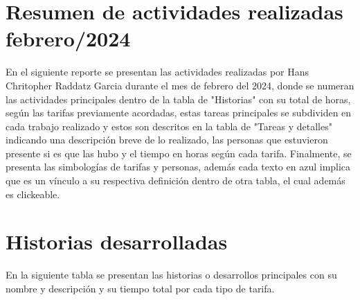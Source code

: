 \documentclass{article}
\begin{document}
\section*{Resumen de actividades realizadas febrero/2024}

En el siguiente reporte se presentan las actividades realizadas por Hans Chritopher Raddatz Garcia durante el mes de febrero del 2024, donde se numeran las actividades principales dentro de la tabla de "Historias" con su total de horas, según las tarifas previamente acordadas, estas tareas principales se subdividen en cada trabajo realizado y estos son descritos en la tabla de "Tareas y detalles" indicando una descripción breve de lo realizado, las personas que estuvieron presente si es que las hubo y el tiempo en horas según cada tarifa.
Finalmente, se presenta las simbologías de tarifas y personas, además cada texto en azul implica que es un vínculo a su respectiva definición dentro de otra tabla, el cual además es clickeable. 

\section{Historias desarrolladas}
En la siguiente tabla se presentan las historias o desarrollos principales con su nombre y descripción y su tiempo total por cada tipo de tarifa.
\end{document}
